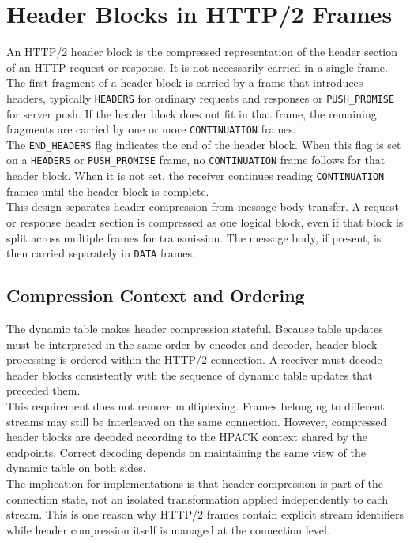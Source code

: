 \documentclass{scrbook}
\begin{document}
\section{Header Blocks in HTTP/2 Frames}

An HTTP/2 header block is the compressed representation of the header section of an HTTP request or response. It is not necessarily carried in a single frame. The first fragment of a header block is carried by a frame that introduces headers, typically \texttt{HEADERS} for ordinary requests and responses or \texttt{PUSH\_PROMISE} for server push. If the header block does not fit in that frame, the remaining fragments are carried by one or more \texttt{CONTINUATION} frames.\\

The \texttt{END\_HEADERS} flag indicates the end of the header block. When this flag is set on a \texttt{HEADERS} or \texttt{PUSH\_PROMISE} frame, no \texttt{CONTINUATION} frame follows for that header block. When it is not set, the receiver continues reading \texttt{CONTINUATION} frames until the header block is complete.\\

This design separates header compression from message-body transfer. A request or response header section is compressed as one logical block, even if that block is split across multiple frames for transmission. The message body, if present, is then carried separately in \texttt{DATA} frames.

\subsection{Compression Context and Ordering}

The dynamic table makes header compression stateful. Because table updates must be interpreted in the same order by encoder and decoder, header block processing is ordered within the HTTP/2 connection. A receiver must decode header blocks consistently with the sequence of dynamic table updates that preceded them.\\

This requirement does not remove multiplexing. Frames belonging to different streams may still be interleaved on the same connection. However, compressed header blocks are decoded according to the HPACK context shared by the endpoints. Correct decoding depends on maintaining the same view of the dynamic table on both sides.\\

The implication for implementations is that header compression is part of the connection state, not an isolated transformation applied independently to each stream. This is one reason why HTTP/2 frames contain explicit stream identifiers while header compression itself is managed at the connection level.
\end{document}
